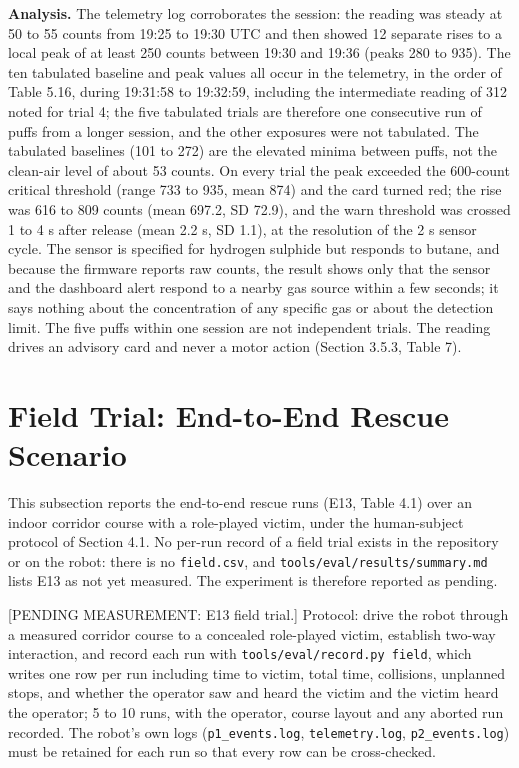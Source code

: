 \textbf{Analysis.} The telemetry log corroborates the session: the reading was steady at 50 to 55 counts from 19:25 to 19:30 UTC and then showed 12 separate rises to a local peak of at least 250 counts between 19:30 and 19:36 (peaks 280 to 935). The ten tabulated baseline and peak values all occur in the telemetry, in the order of Table 5.16, during 19:31:58 to 19:32:59, including the intermediate reading of 312 noted for trial 4; the five tabulated trials are therefore one consecutive run of puffs from a longer session, and the other exposures were not tabulated. The tabulated baselines (101 to 272) are the elevated minima between puffs, not the clean-air level of about 53 counts. On every trial the peak exceeded the 600-count critical threshold (range 733 to 935, mean 874) and the card turned red; the rise was 616 to 809 counts (mean 697.2, SD 72.9), and the warn threshold was crossed 1 to 4 s after release (mean 2.2 s, SD 1.1), at the resolution of the 2 s sensor cycle. The sensor is specified for hydrogen sulphide but responds to butane, and because the firmware reports raw counts, the result shows only that the sensor and the dashboard alert respond to a nearby gas source within a few seconds; it says nothing about the concentration of any specific gas or about the detection limit. The five puffs within one session are not independent trials. The reading drives an advisory card and never a motor action (Section 3.5.3, Table 7).

\section{Field Trial: End-to-End Rescue Scenario}

This subsection reports the end-to-end rescue runs (E13, Table 4.1) over an indoor corridor course with a role-played victim, under the human-subject protocol of Section 4.1. No per-run record of a field trial exists in the repository or on the robot: there is no \texttt{field.csv}, and \texttt{tools/eval/results/summary.md} lists E13 as not yet measured. The experiment is therefore reported as pending.

[PENDING MEASUREMENT: E13 field trial.] Protocol: drive the robot through a measured corridor course to a concealed role-played victim, establish two-way interaction, and record each run with \texttt{tools/eval/record.py field}, which writes one row per run including time to victim, total time, collisions, unplanned stops, and whether the operator saw and heard the victim and the victim heard the operator; 5 to 10 runs, with the operator, course layout and any aborted run recorded. The robot's own logs (\texttt{p1\_events.log}, \texttt{telemetry.log}, \texttt{p2\_events.log}) must be retained for each run so that every row can be cross-checked.

